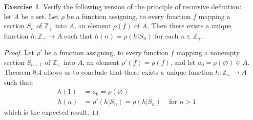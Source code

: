 \documentclass[11pt,a4paper,twoside]{article}
\theoremstyle{definition}
\newcounter{excounter}
\newtheorem{exercise}[excounter]{Exercise}
\begin{document}
\begin{exercise}

  Verify the following version of the principle of recursive definition: let $A$ be a set.
  Let $\rho$ be a function assigning, to every function $f$ mapping a section $S_n$ of $\mathbb{Z}_+$
  into $A$, an element $\rho (f)$ of $A$. Then there exists a unique function $h : \mathbb{Z}_+ \to A$
  such that $h (n) = \rho ( h | S_n )$ for each $n \in \mathbb{Z}_+$.

\end{exercise}

\begin{proof}

  Let $\rho'$ be a function assigning, to every function $f$ mapping a nonempty section $S_{n + 1}$ of $\mathbb{Z}_+$
  into $A$, an element $\rho' (f) = \rho (f)$, and let $a_0 = \rho ( \varnothing ) \in A$. Theorem 8.4 allows us to
  conclude that there exists a unique function $h : \mathbb{Z}_+ \to A$ such that:
  \begin{align*}
    h (1) &= a_0 = \rho ( \varnothing ) \\
    h (n) &= \rho' ( h | S_n ) = \rho ( h | S_n ) &\text{ for } n > 1
  \end{align*}
  which is the expected result.

\end{proof}
\end{document}
